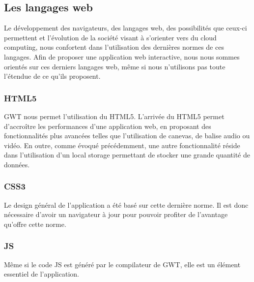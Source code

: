 
\subsection{Les langages web}
Le développement des navigateurs, des langages web, des possibilités que ceux-ci permettent et l'évolution de la société visant à s'orienter vers du cloud computing, nous confortent dans l'utilisation des dernières normes de ces langages. Afin de proposer une application web interactive, nous nous sommes orientés sur ces derniers langages web, même si nous n'utilisons pas toute l'étendue de ce qu'ils proposent.

\subsubsection{HTML5}
GWT nous permet l'utilisation du HTML5. L'arrivée du HTML5 permet d’accroître les performances d'une application web, en proposant des fonctionnalités plus avancées telles que l'utilisation de canevas, de balise audio ou vidéo. 
\newline
\indent
En outre, comme évoqué précédemment, une autre fonctionnalité réside dans l'utilisation d'un local storage permettant de stocker une grande quantité de données.

\subsubsection{CSS3}
Le design général de l'application a été basé sur cette dernière norme. Il est donc nécessaire d'avoir un navigateur à jour pour pouvoir profiter de l'avantage qu'offre cette norme.

\subsubsection{JS}
Même si le code JS est généré par le compilateur de GWT, elle est un élément essentiel de l'application. 
 

